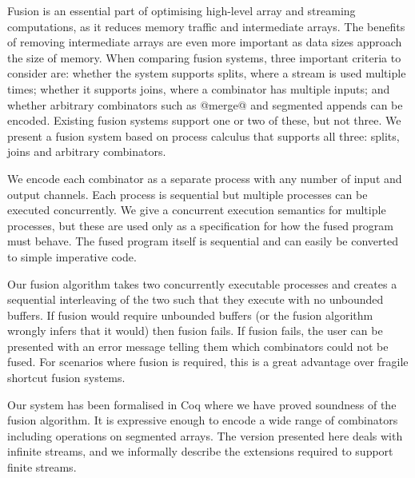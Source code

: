 
Fusion is an essential part of optimising high-level array and streaming computations, as it reduces memory traffic and intermediate arrays.
The benefits of removing intermediate arrays are even more important as data sizes approach the size of memory.
When comparing fusion systems, three important criteria to consider are: whether the system supports splits, where a stream is used multiple times; whether it supports joins, where a combinator has multiple inputs; and whether arbitrary combinators such as @merge@ and segmented appends can be encoded.
Existing fusion systems support one or two of these, but not three.
We present a fusion system based on process calculus that supports all three: splits, joins and arbitrary combinators.

We encode each combinator as a separate process with any number of input and output channels.
Each process is sequential but multiple processes can be executed concurrently.
We give a concurrent execution semantics for multiple processes, but these are used only as a specification for how the fused program must behave.
The fused program itself is sequential and can easily be converted to simple imperative code.

Our fusion algorithm takes two concurrently executable processes and creates a sequential interleaving of the two such that they execute with no unbounded buffers.
If fusion would require unbounded buffers (or the fusion algorithm wrongly infers that it would) then fusion fails.
If fusion fails, the user can be presented with an error message telling them which combinators could not be fused.
For scenarios where fusion is required, this is a great advantage over fragile shortcut fusion systems.

Our system has been formalised in Coq where we have proved soundness of the fusion algorithm.
It is expressive enough to encode a wide range of combinators including operations on segmented arrays.
The version presented here deals with infinite streams, and we informally describe the extensions required to support finite streams.
